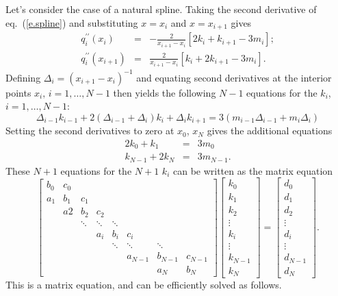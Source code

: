 Let's consider the case of a natural spline. Taking the second derivative of eq.~(\ref{e.spline}) and substituting $x=x_{i}$ and $x=x_{i+1}$ gives
\begin{eqnarray}
\label{e.d2spline-left}
q^{\prime\prime}_{i}(x_{i}) &=& -\frac{2}{x_{i+1}-x_{i}}\left[ 2k_{i} + k_{i+1} - 3m_{i} \right];\\
\label{e.d2spline-right}
q^{\prime\prime}_{i}(x_{i+1}) &=& \frac{2}{x_{i+1}-x_{i}}\left[ k_{i} + 2k_{i+1} - 3m_{i} \right].
\end{eqnarray}
Defining $\Delta_{i} = (x_{i+1}-x_{i})^{-1}$ and equating second derivatives at the interior points $x_{i},\,i=1,\ldots,N-1$ then yields the following $N-1$ equations for the $k_{i}$, $i=1,\ldots,N-1$:
\begin{equation}
\Delta_{i-1}k_{i-1} + 2\left(\Delta_{i-1} + \Delta_{i}\right) k_{i} + \Delta_{i}k_{i+1} = 3\left(m_{i-1}\Delta_{i-1} + m_{i}\Delta_{i}\right)
\end{equation}
Setting the second derivatives to zero at $x_{0}$, $x_{N}$ gives the additional equations
\begin{eqnarray}
2k_{0} + k_{1} &=& 3m_{0}\\
k_{N-1} + 2k_{N} &=& 3m_{N-1}.
\end{eqnarray}
These $N+1$ equations for the $N+1$ $k_{i}$ can be written as the matrix equation
\[
\left[\begin{array}{ccccccccccc}
	b_{0} & c_{0} \\
	a_{1} & b_{1} & c_{1} \\
	& a{2} & b_{2} & c_{2}\\
	& & \ddots & \ddots & \ddots \\
	& & & a_{i} & b_{i} & c_{i} \\
	& & & & \ddots & \ddots & \ddots \\
	& & & & & a_{N-1} & b_{N-1} & c_{N-1} \\
	& & & & & & a_{N} & b_{N} 
\end{array}\right]
\left[\begin{array}{c}
	k_{0}\\
	k_{1}\\
	k_{2}\\
	\vdots\\
	k_{i}\\
	\vdots\\
	k_{N-1}\\
	k_{N}
\end{array}\right] = 
\left[\begin{array}{c}
	d_{0}\\
	d_{1}\\
	d_{2}\\
	\vdots\\
	d_{i}\\
	\vdots\\
	d_{N-1}\\
	d_{N}
\end{array}\right].
\]
This is a  matrix equation, and can be efficiently solved as follows\cite{Press2007Numerical-Recip}.

